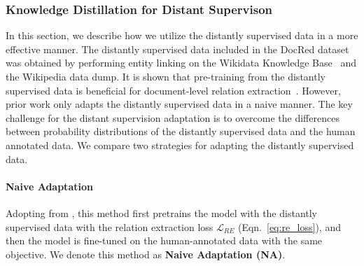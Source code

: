 \documentclass[11pt]{article}
\begin{document}
\subsubsection{Knowledge Distillation for Distant Supervison}
In this section, we describe how we utilize the distantly supervised data in a more effective manner. The distantly supervised data included in the DocRed dataset \citep{yao2019docred} was obtained by performing entity linking on the Wikidata Knowledge Base~\citep{vrandevcic2014wikidata} and the Wikipedia data dump.  It is shown that pre-training from the distantly supervised data is beneficial for document-level relation extraction~\citep{xu2021entity}. However, prior work only adapts the distantly supervised data in a naive manner. The key challenge for the distant supervision adaptation is to overcome the differences between probability distributions of the distantly supervised data and the human annotated data. We compare two strategies for adapting the distantly supervised data.

    \paragraph{Naive Adaptation} Adopting from \citep{xu2021entity}, this method first pretrains the model with the distantly supervised data with the relation extraction loss $\mathcal{L}_{RE}$ (Eqn.~\ref{eq:re_loss}), and then the model is fine-tuned on the human-annotated data with the same objective. We denote this method as \textbf{Naive Adaptation (NA)}.
    
\end{document}
